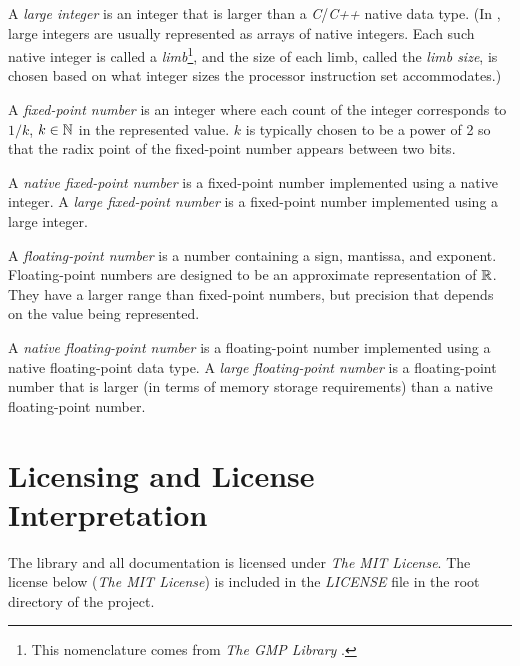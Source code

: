 A \emph{large integer} is an integer 
that is larger than a \emph{C}/\emph{C++} native data type.  
(In \emph{\productbasenameshort{}}, large integers are 
usually represented as arrays of native integers.  Each such 
native integer is called a \emph{limb}\footnote{This nomenclature comes 
from \emph{The GMP Library} 
\cite{bibref:w:gmplibhomepage}.}, and the size of each limb, 
called the \emph{limb size}, is chosen 
based on what integer sizes the processor instruction set 
accommodates.) 

A \emph{fixed-point number} is an 
integer where each count of the integer corresponds to 
$1/k$, $k \in {\mathbb{N}}$ in the represented value.  
$k$ is typically chosen to be a power of 2 so that the radix 
point of the fixed-point number appears between two bits.  

A \emph{native fixed-point number} is a fixed-point number 
implemented using a native integer.  A \emph{large 
fixed-point number} is a fixed-point number implemented 
using a large integer.  

A \emph{floating-point number} 
is a number containing a sign, mantissa, and exponent.  
Floating-point numbers are designed to be an approximate 
representation of ${\mathbb{R}}$.  They have a larger range 
than fixed-point numbers, but precision that depends on the 
value being represented.  

A \emph{native floating-point number} is a floating-point 
number implemented using a native floating-point data type.  
A \emph{large floating-point number} is a floating-point 
number that is larger (in terms of memory storage 
requirements) than a native floating-point number.  


\section{Licensing and License Interpretation}
\label{ciov0:slip0}

The \emph{\productbasenameshort{}} library and all 
documentation is licensed under \emph{The MIT License}.  The 
license below (\emph{The MIT License}) is included in the 
\emph{LICENSE} file in the root directory of the project.  

